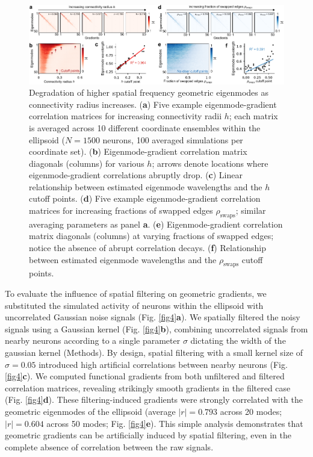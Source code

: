 \documentclass{article}
\begin{document}
\begin{figure}[t]
    \centering
    \includegraphics[width=1.0\linewidth]{figures/figure3.pdf}
    \caption{Degradation of higher spatial frequency geometric eigenmodes as connectivity radius increases. (\textbf{a}) Five example eigenmode-gradient correlation matrices for increasing connectivity radii $h$; each matrix is averaged across 10 different coordinate ensembles within the ellipsoid ($N=1500$ neurons, 100 averaged simulations per coordinate set). (\textbf{b}) Eigenmode-gradient correlation matrix diagonals (columns) for various $h$; arrows denote locations where eigenmode-gradient correlations abruptly drop. (\textbf{c}) Linear relationship between estimated eigenmode wavelengths and the $h$ cutoff points. (\textbf{d}) Five example eigenmode-gradient correlation matrices for increasing fractions of swapped edges $\rho_{\text{swaps}}$; similar averaging parameters as panel \textbf{a}. (\textbf{e}) Eigenmode-gradient correlation matrix diagonals (columns) at varying fractions of swapped edges; notice the absence of abrupt correlation decays. (\textbf{f}) Relationship between estimated eigenmode wavelengths and the $\rho_{\text{swaps}}$ cutoff points.}
    \label{fig3}
    \hrulefill
\end{figure}

To evaluate the influence of spatial filtering on geometric gradients, we substituted the simulated activity of neurons within the ellipsoid with uncorrelated Gaussian noise signals (Fig. \ref{fig4}\textbf{a}). We spatially filtered the noisy signals using a Gaussian kernel (Fig. \ref{fig4}\textbf{b}), combining uncorrelated signals from nearby neurons according to a single parameter $\sigma$ dictating the width of the gaussian kernel (Methods). By design, spatial filtering with a small kernel size of $\sigma=0.05$ introduced high artificial correlations between nearby neurons (Fig. \ref{fig4}\textbf{c}). We computed functional gradients from both unfiltered and filtered correlation matrices, revealing strikingly smooth gradients in the filtered case (Fig. \ref{fig4}\textbf{d}). These filtering-induced gradients were strongly correlated with the geometric eigenmodes of the ellipsoid (average $|r|=0.793$ across 20 modes; $|r|=0.604$ across 50 modes; Fig. \ref{fig4}\textbf{e}). This simple analysis demonstrates that geometric gradients can be artificially induced by spatial filtering, even in the complete absence of correlation between the raw signals.
\end{document}
